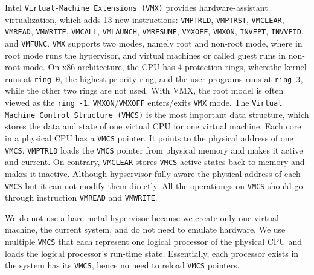 Intel \texttt{Virtual-Machine Extensions (VMX)} provides hardware-assistant virtualization, which adds 13 new instructions: \texttt{VMPTRLD}, \texttt{VMPTRST}, \texttt{VMCLEAR}, \texttt{VMREAD}, \texttt{VMWRITE}, \texttt{VMCALL}, \texttt{VMLAUNCH}, \texttt{VMRESUME}, \texttt{VMXOFF}, \texttt{VMXON}, \texttt{INVEPT}, \texttt{INVVPID}, and \texttt{VMFUNC}. \texttt{VMX} supports two modes, namely root and non-root mode, where in root mode runs the hypervisor, and virtual machines or called guest runs in non-root mode. On x86 architecture, the CPU has 4 protection rings, wherethe kernel runs at \texttt{ring 0}, the highest priority ring, and the user programs runs at \texttt{ring 3}, while the other two rings are not used. With VMX, the root model is often viewed as the \texttt{ring -1}. \texttt{VMXON}/\texttt{VMXOFF} enters/exits \texttt{VMX} mode. The \texttt{Virtual Machine Control Structure (VMCS)} is the most important data structure, which stores the data and state of one virtual CPU for one virtual machine. Each core in a physical CPU has a \texttt{VMCS} pointer. It points to the physical address of one \texttt{VMCS}. \texttt{VMPTRLD} loads the \texttt{VMCS} pointer from physical memory and makes it active and current. On contrary, \texttt{VMCLEAR} stores \texttt{VMCS} active states back to memory and makes it inactive. Although hypservisor fully aware the physical address of each \texttt{VMCS} but it can not modify them directly. All the operationgs on \texttt{VMCS} should go through instruction \texttt{VMREAD} and \texttt{VMWRITE}.



We do not use a bare-metal hypervisor because we create only one virtual machine, the current system, and do not need to emulate hardware. We use multiple \texttt{VMCS} that each represent one logical processor of the physical CPU and loads the logical processor's run-time state. Essentially, each processor exists in the system has its \texttt{VMCS}, hence no need to reload \texttt{VMCS} pointers.

